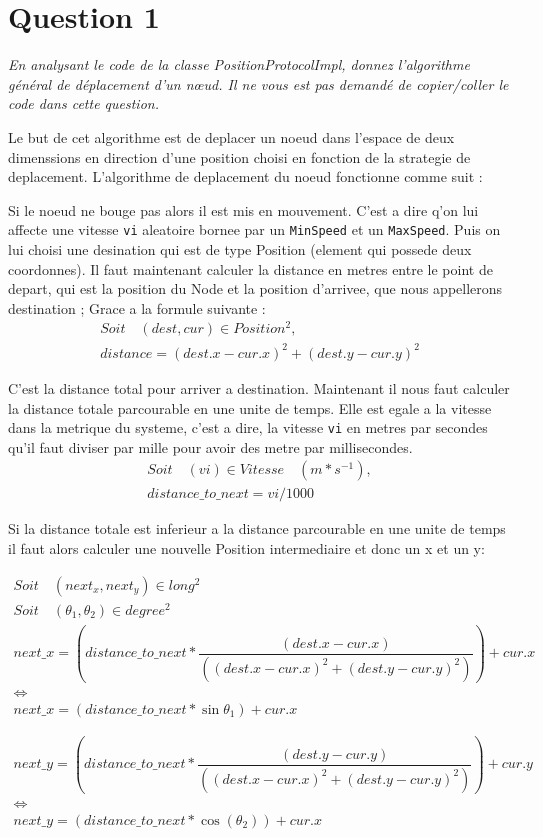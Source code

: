 \documentclass[11pt,a4paper,sans]{report}
\begin{document}
	\section{Question 1}
	\textit{En analysant le code de la classe PositionProtocolImpl, donnez l’algorithme général de déplacement d’un nœud. Il ne vous est pas demandé de copier/coller le code dans cette question.}
	\par Le but de cet algorithme est de deplacer un noeud dans l'espace de deux dimenssions en direction d'une position choisi en fonction de la strategie de deplacement.  L'algorithme de deplacement du noeud fonctionne comme suit :
	\par Si le noeud ne bouge pas alors il est mis en mouvement. C'est a dire q'on lui affecte une vitesse \texttt{vi} aleatoire bornee par un \texttt{MinSpeed} et un \texttt{MaxSpeed}. Puis on lui choisi une desination qui est de type Position (element qui possede deux coordonnes). Il faut maintenant calculer la distance en metres entre le point de depart, qui est la position du Node et la position d'arrivee, que nous appellerons destination ; Grace a la formule suivante :
\begin{gather}
Soit \quad  (dest, cur) \in Position^2, \\
distance = (dest.x - cur.x)^2 + (dest.y - cur.y)^2 
\end{gather}
\par C'est la distance total pour arriver a destination. Maintenant il nous faut calculer la distance totale parcourable en une unite de temps. Elle est egale a la vitesse dans la metrique du systeme, c'est a dire, la vitesse \texttt{vi} en metres par secondes qu'il faut diviser par mille pour avoir des metre par millisecondes.
\begin{gather}
Soit  \quad  (vi) \in Vitesse \quad (m*s^{-1}), \\
distance\_to\_next= vi / 1000
\end{gather}
\par Si la distance totale est inferieur a la distance parcourable en une unite de temps il faut alors calculer une nouvelle Position intermediaire et donc un x et un y:

\begin{gather}
Soit  \quad  (next_x,next_y) \in long^2 \\
Soit  \quad  (\theta_{1}, \theta_{2}) \in degree^2 \\
next\_x =  (distance\_to\_next * \dfrac{(dest.x - cur.x)}{((dest.x - cur.x)^2 + (dest.y - cur.y)^2)}) + cur.x \\
\Longleftrightarrow \\
next\_x =  (distance\_to\_next * \sin{\theta_{1}}) + cur.x \\
\\
\\
next\_y =  (distance\_to\_next * \dfrac{(dest.y - cur.y)}{((dest.x - cur.x)^2 + (dest.y - cur.y)^2)}) + cur.y \\
\Longleftrightarrow \\
next\_y =  (distance\_to\_next * \cos(\theta_{2})) + cur.x \\
\end{gather}
\end{document}
